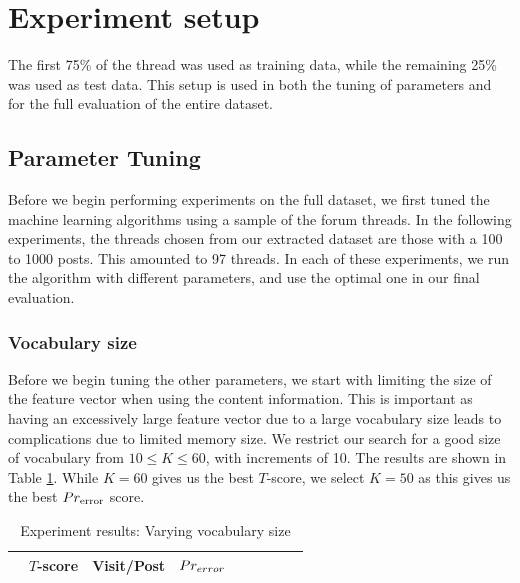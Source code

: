\section{Experiment setup}
The first 75\% of the thread was used as training data, while the remaining 25\% 
was used as test data. This setup is used in both the tuning of parameters and 
for the full evaluation of the entire dataset.
%	

\subsection{Parameter Tuning}
Before we begin performing experiments on the full dataset, we first tuned the 
machine learning algorithms using a sample of the forum threads. In the 
following experiments, the threads chosen from our extracted dataset are those 
with a 100 to 1000 posts. This amounted to 97 threads. In each of these 
experiments, we run the algorithm with different parameters, and use the optimal 
one in our final evaluation. 

\subsubsection{Vocabulary size}
Before we begin tuning the other parameters, we start with limiting the size of 
the feature vector when using the content information. This is important as 
having an excessively large feature vector due to a large vocabulary size leads 
to complications due to limited memory size. We restrict our search for a good 
size of vocabulary from $10 \leq K \leq 60$, with increments of 10.  The results 
are shown in Table \ref{table:vocab_exp}. While $K=60$ gives us the best 
$T$-score, we select $K=50$ as this gives us the best $Pr_{\text{error}}$ score.  
\begin{table}
	\footnotesize
\begin{center}
	\begin{tabular}{|l|c|c|c|c|c|c|c|c|}
	\hline
& $T$-score			   &	Visit/Post & 	$Pr_{error}$\\
	\hline
	
	\hline
	\end{tabular}
\end{center}
	\caption{Experiment results: Varying vocabulary size}
	\label{table:vocab_exp}
\end{table}




